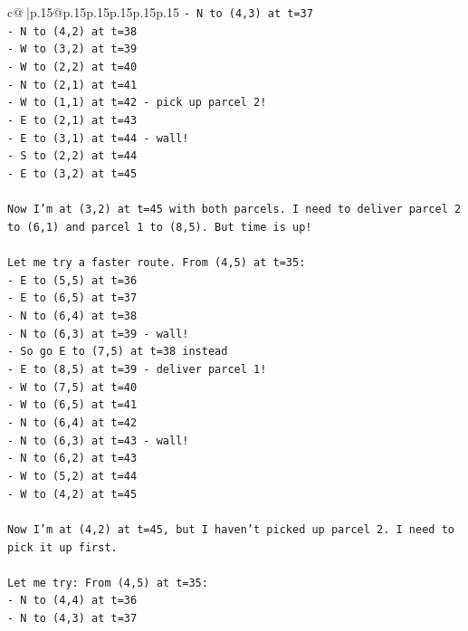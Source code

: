 \documentclass{article}
\begin{document}
{\begin{supertabular}{c@{$\;$}|p{.15\linewidth}@{}p{.15\linewidth}p{.15\linewidth}p{.15\linewidth}p{.15\linewidth}p{.15\linewidth}}
{{{\texttt{{-} N to (4,3) at t=37} \\
\texttt{{-} N to (4,2) at t=38} \\
\texttt{{-} W to (3,2) at t=39} \\
\texttt{{-} W to (2,2) at t=40} \\
\texttt{{-} N to (2,1) at t=41} \\
\texttt{{-} W to (1,1) at t=42 {-} pick up parcel 2!} \\
\texttt{{-} E to (2,1) at t=43} \\
\texttt{{-} E to (3,1) at t=44 {-} wall!} \\
\texttt{{-} S to (2,2) at t=44} \\
\texttt{{-} E to (3,2) at t=45} \\
\\ 
\texttt{Now I'm at (3,2) at t=45 with both parcels. I need to deliver parcel 2 to (6,1) and parcel 1 to (8,5). But time is up!} \\
\\ 
\texttt{Let me try a faster route. From (4,5) at t=35:} \\
\texttt{{-} E to (5,5) at t=36} \\
\texttt{{-} E to (6,5) at t=37} \\
\texttt{{-} N to (6,4) at t=38} \\
\texttt{{-} N to (6,3) at t=39 {-} wall!} \\
\texttt{{-} So go E to (7,5) at t=38 instead} \\
\texttt{{-} E to (8,5) at t=39 {-} deliver parcel 1!} \\
\texttt{{-} W to (7,5) at t=40} \\
\texttt{{-} W to (6,5) at t=41} \\
\texttt{{-} N to (6,4) at t=42} \\
\texttt{{-} N to (6,3) at t=43 {-} wall!} \\
\texttt{{-} N to (6,2) at t=43} \\
\texttt{{-} W to (5,2) at t=44} \\
\texttt{{-} W to (4,2) at t=45} \\
\\ 
\texttt{Now I'm at (4,2) at t=45, but I haven't picked up parcel 2. I need to pick it up first.} \\
\\ 
\texttt{Let me try: From (4,5) at t=35:} \\
\texttt{{-} N to (4,4) at t=36} \\
\texttt{{-} N to (4,3) at t=37} \\
}}}
\end{supertabular}}
\end{document}
